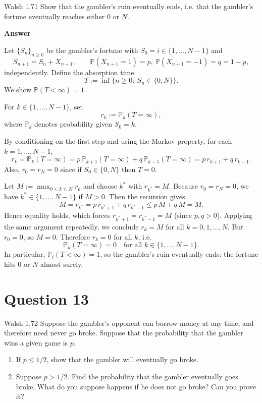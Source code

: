 \documentclass[letterpaper]{article}
\begin{document}
		{\color{deepred} Walsh 1.71} Show that the gambler's ruin eventually ends, i.e. that the gambler's fortune eventually reaches either $0$ or $N$.
	
		

		
		\textbf{Answer}
		
		Let $\{S_n\}_{n\ge 0}$ be the gambler's fortune with $S_0=i\in\{1,\dots,N-1\}$ and
		\[
		S_{n+1}=S_n+X_{n+1},\qquad \mathbb{P}(X_{n+1}=1)=p,\ \mathbb{P}(X_{n+1}=-1)=q=1-p,
		\]
		independently. Define the absorption time
		\[
		T:=\inf\{n\ge 0:\ S_n\in\{0,N\}\}.
		\]
		We show $\mathbb{P}(T<\infty)=1$.
		
		For $k\in\{1,\dots,N-1\}$, set
		\[
		r_k:=\mathbb{P}_k(T=\infty),
		\]
		where $\mathbb{P}_k$ denotes probability given $S_0=k$.
		
		By conditioning on the first step and using the Markov property,
		for each $k=1,\dots,N-1$,
		\[
		r_k=\mathbb{P}_k(T=\infty)
		=p\,\mathbb{P}_{k+1}(T=\infty)+q\,\mathbb{P}_{k-1}(T=\infty)
		= p\,r_{k+1}+q\,r_{k-1}.
		\]
		Also, $r_0=r_N=0$ since if $S_0\in\{0,N\}$ then $T=0$.
		
		Let $M:=\max_{0\le k\le N} r_k$ and choose $k^\ast$ with $r_{k^\ast}=M$.
		Because $r_0=r_N=0$, we have $k^\ast\in\{1,\dots,N-1\}$ if $M>0$.
		Then the recursion gives
		\[
		M=r_{k^\ast}=p\,r_{k^\ast+1}+q\,r_{k^\ast-1}\le p\,M+q\,M=M.
		\]
		Hence equality holds, which forces $r_{k^\ast+1}=r_{k^\ast-1}=M$ (since $p,q>0$).
		Applying the same argument repeatedly, we conclude $r_k=M$ for all $k=0,1,\dots,N$.
		But $r_0=0$, so $M=0$. Therefore $r_k=0$ for all $k$, i.e.
		\[
		\mathbb{P}_k(T=\infty)=0\quad\text{for all }k\in\{1,\dots,N-1\}.
		\]
		In particular, $\mathbb{P}_i(T<\infty)=1$, so the gambler's ruin eventually ends:
		the fortune hits $0$ or $N$ almost surely.
		
		
		\clearpage
		
		\section{Question 13}
		
		{\color{deepred} Walsh 1.72} Suppose the gambler's opponent can borrow money at any time, and therefore need never go broke. Suppose that the probability that the gambler wins a given game is $p$.
	
\begin{enumerate}
\item[(a)] If $p \le 1/2$, show that the gambler will eventually go broke.
\item[(b)] Suppose $p > 1/2$. Find the probability that the gambler eventually goes broke. What do you suppose happens if he does not go broke? Can you prove it?
\end{enumerate}
		
\end{document}
